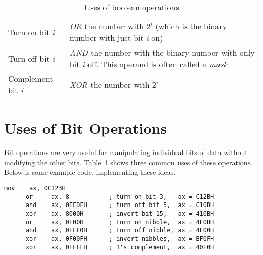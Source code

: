 \begin{table}
\begin{tabular}{lp{3in}}
Turn on bit \emph{i} & \emph{OR} the number with $2^i$ (which is
                              the binary number with just bit \emph{i} on) \\
Turn off bit \emph{i} & \emph{AND} the number with the binary number with
                              only bit \emph{i} off. This operand is often
                  	      called a \emph{mask} \\
Complement bit \emph{i} & \emph{XOR} the number with $2^i$
\end{tabular}
\caption{Uses of boolean operations \label{tab:bool}}
\end{table}

\section{Uses of Bit Operations}

Bit operations are very useful for manipulating individual bits of data
without modifying the other bits. Table~\ref{tab:bool} shows three common
uses of these operations. Below is some example code, implementing these
ideas.
\begin{lstlisting}[language={[x86masm]Assembler}]
      mov    ax, 0C123H
      or     ax, 8           ; turn on bit 3,   ax = C12BH
      and    ax, 0FFDFH      ; turn off bit 5,  ax = C10BH
      xor    ax, 8000H       ; invert bit 15,   ax = 410BH
      or     ax, 0F00H       ; turn on nibble,  ax = 4F0BH
      and    ax, 0FFF0H      ; turn off nibble, ax = 4F00H
      xor    ax, 0F00FH      ; invert nibbles,  ax = BF0FH
      xor    ax, 0FFFFH      ; 1's complement,  ax = 40F0H
\end{lstlisting}


